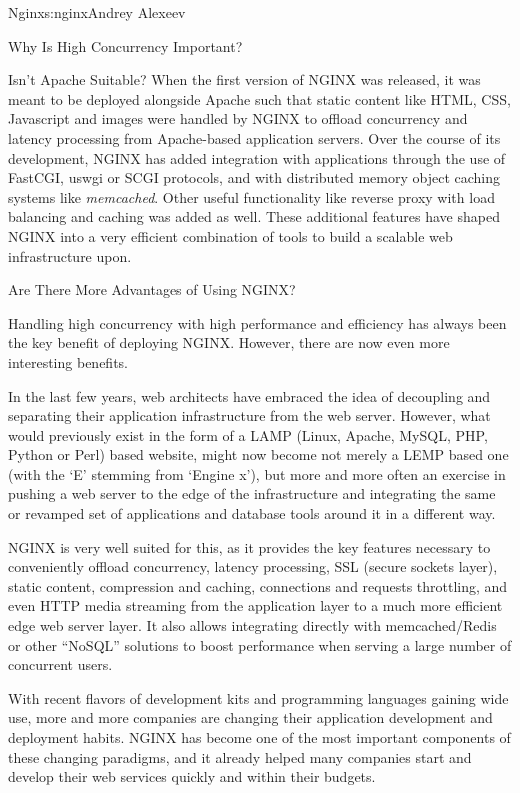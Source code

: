 \begin{aosachapter}{Nginx}{s:nginx}{Andrey Alexeev}
\begin{aosasect1}{Why Is High Concurrency Important?}
\begin{aosasect2}{Isn't Apache Suitable?}
When the first version of NGINX was released, it was meant to be
deployed alongside Apache such that static content like HTML, CSS,
Javascript and images were handled by NGINX to offload concurrency and
latency processing from Apache-based application servers. Over the
course of its development, NGINX has added integration with
applications through the use of FastCGI, uswgi or SCGI protocols, and
with distributed memory object caching systems like
\emph{memcached}. Other useful functionality like reverse proxy with
load balancing and caching was added as well. These additional
features have shaped NGINX into a very efficient combination of tools
to build a scalable web infrastructure upon.

\end{aosasect2}

\begin{aosasect2}{Are There More Advantages of Using NGINX?}

Handling high concurrency with high performance and efficiency has
always been the key benefit of deploying NGINX. However, there
are now even more interesting benefits.

In the last few years, web architects have embraced the idea of
decoupling and separating their application infrastructure from the
web server. However, what would previously exist in the form of a LAMP
(Linux, Apache, MySQL, PHP, Python or Perl) based website, might now
become not merely a LEMP based one (with the `E' stemming from `Engine
x'), but more and more often an exercise in pushing a web server to
the edge of the infrastructure and integrating the same or revamped
set of applications and database tools around it in a different way.

NGINX is very well suited for this, as it provides the key features
necessary to conveniently offload concurrency, latency processing, SSL
(secure sockets layer), static content, compression and caching,
connections and requests throttling, and even HTTP media streaming
from the application layer to a much more efficient edge web server
layer. It also allows integrating directly with memcached/Redis or
other ``NoSQL'' solutions to boost performance when serving a large
number of concurrent users.

With recent flavors of development kits and programming languages
gaining wide use, more and more companies are changing their
application development and deployment habits. NGINX has become one of
the most important components of these changing paradigms, and it
already helped many companies start and develop their web services
quickly and within their budgets.


\end{aosasect2}
\end{aosasect1}
\end{aosachapter}
